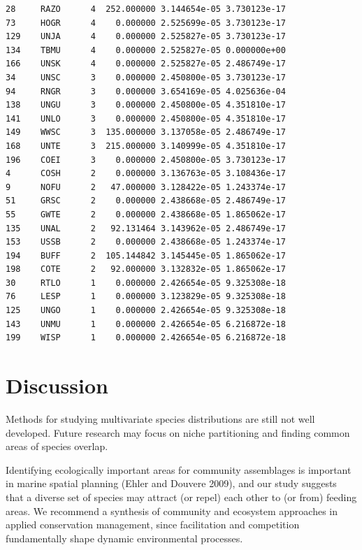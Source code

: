 \documentclass{statsoc}
\begin{document}
\begin{lstlisting}
28     RAZO      4  252.000000 3.144654e-05 3.730123e-17
73     HOGR      4    0.000000 2.525699e-05 3.730123e-17
129    UNJA      4    0.000000 2.525827e-05 3.730123e-17
134    TBMU      4    0.000000 2.525827e-05 0.000000e+00
166    UNSK      4    0.000000 2.525827e-05 2.486749e-17
34     UNSC      3    0.000000 2.450800e-05 3.730123e-17
94     RNGR      3    0.000000 3.654169e-05 4.025636e-04
138    UNGU      3    0.000000 2.450800e-05 4.351810e-17
141    UNLO      3    0.000000 2.450800e-05 4.351810e-17
149    WWSC      3  135.000000 3.137058e-05 2.486749e-17
168    UNTE      3  215.000000 3.140999e-05 4.351810e-17
196    COEI      3    0.000000 2.450800e-05 3.730123e-17
4      COSH      2    0.000000 3.136763e-05 3.108436e-17
9      NOFU      2   47.000000 3.128422e-05 1.243374e-17
51     GRSC      2    0.000000 2.438668e-05 2.486749e-17
55     GWTE      2    0.000000 2.438668e-05 1.865062e-17
135    UNAL      2   92.131464 3.143962e-05 2.486749e-17
153    USSB      2    0.000000 2.438668e-05 1.243374e-17
194    BUFF      2  105.144842 3.145445e-05 1.865062e-17
198    COTE      2   92.000000 3.132832e-05 1.865062e-17
30     RTLO      1    0.000000 2.426654e-05 9.325308e-18
76     LESP      1    0.000000 3.123829e-05 9.325308e-18
125    UNGO      1    0.000000 2.426654e-05 9.325308e-18
143    UNMU      1    0.000000 2.426654e-05 6.216872e-18
199    WISP      1    0.000000 2.426654e-05 6.216872e-18
\end{lstlisting} 






\section{Discussion}

Methods for studying multivariate species distributions are still not well developed. Future research may focus on niche partitioning and finding common areas of species overlap.

Identifying ecologically important areas for community assemblages is important in marine spatial planning (Ehler and Douvere 2009), and our study suggests that a diverse set of species may attract (or repel) each other to (or from) feeding areas. We recommend a synthesis of community and ecosystem approaches in applied conservation management, since facilitation and competition fundamentally shape dynamic environmental processes.
\end{document}
